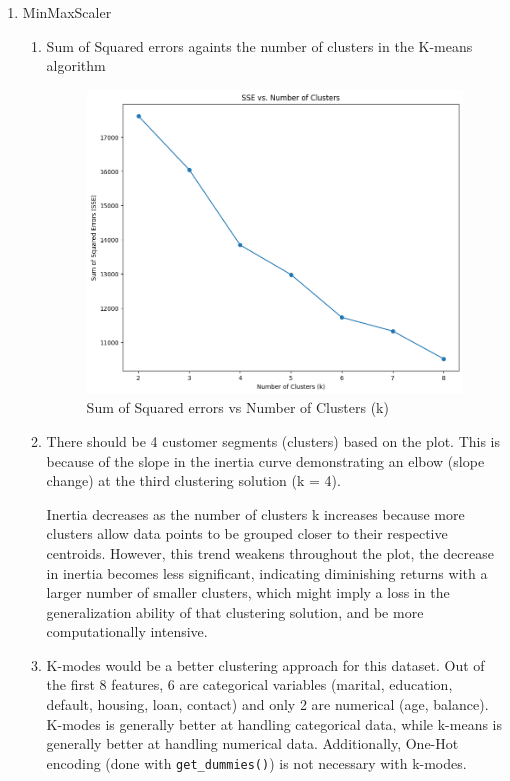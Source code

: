\documentclass{article}
\begin{document}
\begin{enumerate}[leftmargin=\labelsep]
\item MinMaxScaler
\begin{enumerate}
\item Sum of Squared errors againts the number of clusters in the K-means algorithm 
    \begin{figure}[H]  %
        \centering
        \includegraphics[width=0.8\linewidth]{img/sse-v-clusters.png}
        \caption{Sum of Squared errors vs Number of Clusters (k)}
        \label{fig:enter-label}
    \end{figure}

\item There should be 4 customer segments (clusters) based on the plot.
This is because of the slope in the inertia curve demonstrating an elbow (slope change) at
the third clustering solution (k = 4).

Inertia decreases as the number of clusters k increases because more clusters allow data points to be grouped closer to their respective centroids.
However, this trend weakens throughout the plot, the decrease in inertia becomes less significant, indicating diminishing returns with a larger number of smaller clusters, which might imply a loss in the generalization ability of that clustering solution, and be more computationally intensive.

\item K-modes would be a better clustering approach 
for this dataset. Out of the first 8 features, 6 are categorical 
variables (marital, education, default, housing, loan, contact)
and only 2 are numerical (age, balance). K-modes is generally
better at handling categorical data, while k-means is generally
better at handling numerical data. Additionally, One-Hot encoding
(done with \texttt{get\_dummies()}) is not necessary with k-modes.


\end{enumerate}
\end{enumerate}
\end{document}
